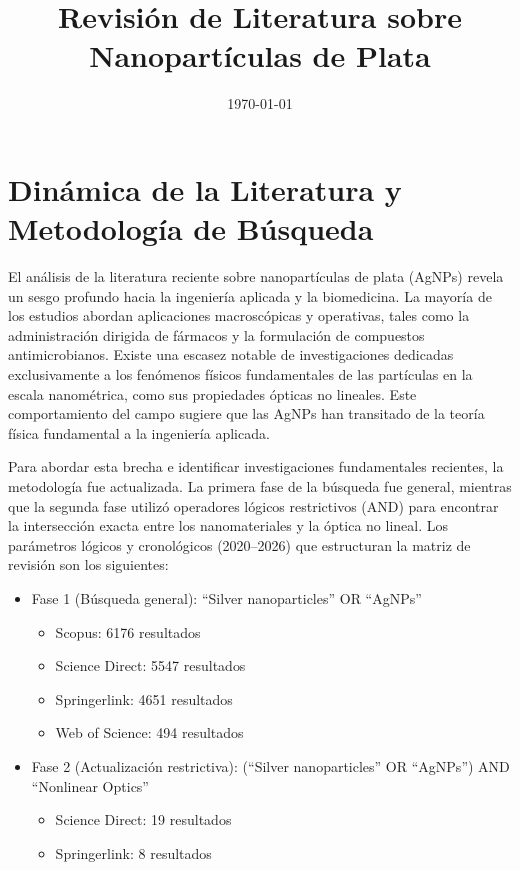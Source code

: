 \documentclass[pdflatex,sn-mathphys-num]{sn-jnl}
\title{Revisión de Literatura sobre Nanopartículas de Plata}
\author{\fnm{Julian L.} \sur{Avila-Martinez}}
\affil{\orgdiv{Programa Académico de Física}, \orgname{Universidad Distrital
Francisco José de Caldas}, \orgaddress{\city{Bogotá D.C.}, \country{Colombia}}}
\date{\today}
\theoremstyle{thmstyleone}%
\theoremstyle{thmstyletwo}%
\theoremstyle{thmstylethree}%
\begin{document}
\maketitle

\section{Dinámica de la Literatura y Metodología de Búsqueda}
El análisis de la literatura reciente sobre nanopartículas de plata (AgNPs)
revela un sesgo profundo hacia la ingeniería aplicada y la biomedicina.
La mayoría de los estudios abordan aplicaciones macroscópicas y operativas, tales
como la administración dirigida de fármacos y la formulación de compuestos
antimicrobianos. Existe una escasez notable de investigaciones dedicadas
exclusivamente a los fenómenos físicos fundamentales de las partículas en la
escala nanométrica, como sus propiedades ópticas no lineales. Este
comportamiento del campo sugiere que las AgNPs han transitado de la teoría
física fundamental a la ingeniería aplicada.

Para abordar esta brecha e identificar investigaciones fundamentales recientes,
la metodología fue actualizada. La primera fase de la búsqueda fue general, mientras
que la segunda fase utilizó operadores lógicos restrictivos (AND) para encontrar la
intersección exacta entre los nanomateriales y la óptica no lineal. Los parámetros
lógicos y cronológicos (2020--2026) que estructuran la matriz de revisión son los siguientes:

\begin{itemize}
	\item Fase 1 (Búsqueda general): \enquote{Silver nanoparticles} OR \enquote{AgNPs}
		\begin{itemize}
			\item Scopus: 6176 resultados
			\item Science Direct: 5547 resultados
			\item Springerlink: 4651 resultados
			\item Web of Science: 494 resultados
		\end{itemize}
	\item Fase 2 (Actualización restrictiva): (\enquote{Silver nanoparticles} OR \enquote{AgNPs}) AND \enquote{Nonlinear Optics}
		\begin{itemize}
			\item Science Direct: 19 resultados
			\item Springerlink: 8 resultados
		\end{itemize}
\end{itemize}
\end{document}
